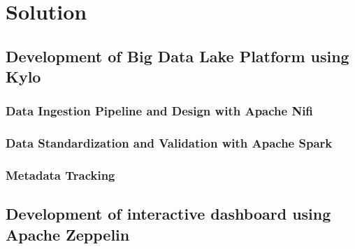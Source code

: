 %

\chapter{Solution}
\label{ownwork} 
\section{Development of Big Data Lake Platform using Kylo}
\label{ownwork.bigdatalake}

\subsection{Data Ingestion Pipeline and Design with Apache Nifi}
\label{ownwork.nifi}
\subsection{Data Standardization and Validation with Apache Spark}
\label{ownwork.standardization}
\subsection{Metadata Tracking}
\label{ownwork.metadata}
\section{Development of interactive dashboard using Apache Zeppelin}
\label{ownwork.zeppelin}